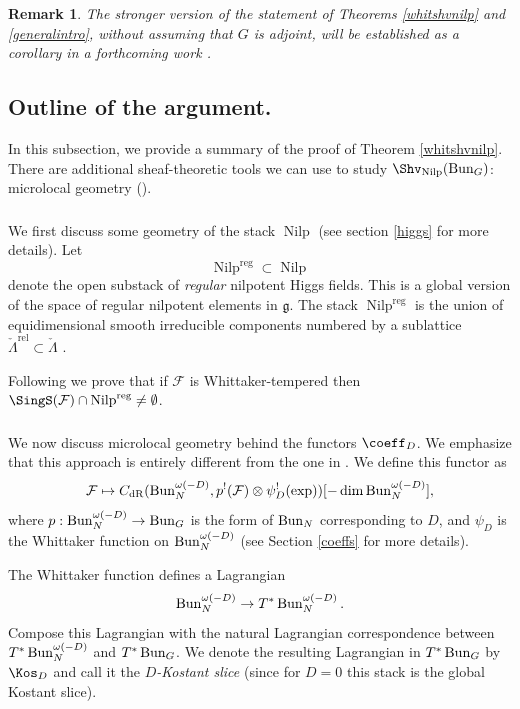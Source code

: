 \documentclass[9pt]{amsart}
\DeclareMathOperator{\reg}{{reg}}
\newcommand{\cF}{{\mathcal F}}
\DeclareMathOperator{\Nilp}{{Nilp}} \DeclareMathOperator{\op}{{op}}
\newtheorem{rem}[subsubsection]{Remark}
\numberwithin{equation}{section}
\newcommand{\dR}{\mathrm{dR}}
\begin{document}
\begin{rem}
	The stronger version of the statement of Theorems \ref{whitshvnilp} and \ref{generalintro}, without assuming that $G$ is adjoint, will be established as a corollary in a forthcoming work \cite{B}.
\end{rem}
	


	\subsection{Outline of the argument.}
In this subsection, we provide a summary of the proof of Theorem \ref{whitshvnilp}. There are additional sheaf-theoretic tools we can use to study $\Shv_{\Nilp}(\Bun_G)$: microlocal geometry (\cite{KS}).

\subsubsection{} We first discuss some geometry of the stack $\Nilp$ (see section \ref{higgs} for more details). Let $$\Nilp^{\reg} \subset \Nilp$$ denote the open substack of {\it regular} nilpotent Higgs fields. This is a global version of the space of regular nilpotent elements in $\mathfrak{g}$. The stack $\Nilp^{\reg}$ is the union of equidimensional smooth irreducible components numbered by a sublattice  $\check{\Lambda}^{\operatorname{rel}} \subset \check{\Lambda}$ .

Following \cite{FR} we prove that if $\cF$ is Whittaker-tempered then $\SingS(\cF) \cap \Nilp^{\reg} \neq \emptyset$. 

\subsubsection{} We now discuss microlocal geometry behind the functors $\coeff_D$. We emphasize that this approach is entirely different from the one in \cite{FR}. We define this functor as 
$$\cF \mapsto C_{\dR}(\Bun_N^{\omega(-D)} , p^!(\cF) \otimes \psi_D^!(\operatorname{exp}))[-\dim \Bun_N^{\omega(-D)}],$$
where $p: \operatorname{{Bun}}_N^{\omega(-D)} \rightarrow \operatorname{{Bun}}_G$ is the form of $\operatorname{{Bun}}_N$ corresponding to $D$, and $\psi_D$ is the Whittaker function on $\operatorname{{Bun}}_N^{\omega(-D)}$ (see Section \ref{coeffs} for more details). 
	
The Whittaker function defines a Lagrangian $$\operatorname{{Bun}}_N^{\omega(-D)} \rightarrow T^*\operatorname{{Bun}}_N^{\omega(-D)}.$$ Compose this Lagrangian with the natural Lagrangian correspondence between $T^*\operatorname{{Bun}}_N^{\omega(-D)}$ and $T^*\operatorname{{Bun}}_G$. We denote the resulting Lagrangian in $T^*\operatorname{{Bun}}_G$ by $\Kos_D$ and call it the {\it $D$-Kostant slice} (since for $D=0$ this stack is the global Kostant slice). 
\end{document}
